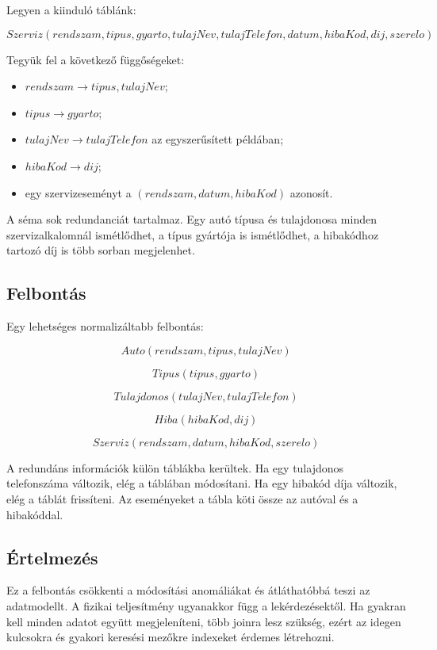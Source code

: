 Legyen a kiinduló táblánk:

\[
  Szerviz(rendszam, tipus, gyarto, tulajNev, tulajTelefon, datum, hibaKod, dij, szerelo)
\]

Tegyük fel a következő függőségeket:

\begin{itemize}
  \item \(rendszam \to tipus, tulajNev\);
  \item \(tipus \to gyarto\);
  \item \(tulajNev \to tulajTelefon\) az egyszerűsített példában;
  \item \(hibaKod \to dij\);
  \item egy szervizeseményt a \((rendszam, datum, hibaKod)\) azonosít.
\end{itemize}

A séma sok redundanciát tartalmaz. Egy autó típusa és tulajdonosa minden szervizalkalomnál ismétlődhet, a típus gyártója is ismétlődhet, a hibakódhoz tartozó díj is több sorban megjelenhet.

\subsection{Felbontás}

Egy lehetséges normalizáltabb felbontás:

\[
  Auto(rendszam, tipus, tulajNev)
\]

\[
  Tipus(tipus, gyarto)
\]

\[
  Tulajdonos(tulajNev, tulajTelefon)
\]

\[
  Hiba(hibaKod, dij)
\]

\[
  Szerviz(rendszam, datum, hibaKod, szerelo)
\]

A redundáns információk külön táblákba kerültek. Ha egy tulajdonos telefonszáma változik, elég a  táblában módosítani. Ha egy hibakód díja változik, elég a  táblát frissíteni. Az eseményeket a  tábla köti össze az autóval és a hibakóddal.

\subsection{Értelmezés}

Ez a felbontás csökkenti a módosítási anomáliákat és átláthatóbbá teszi az adatmodellt. A fizikai teljesítmény ugyanakkor függ a lekérdezésektől. Ha gyakran kell minden adatot együtt megjeleníteni, több joinra lesz szükség, ezért az idegen kulcsokra és gyakori keresési mezőkre indexeket érdemes létrehozni.


